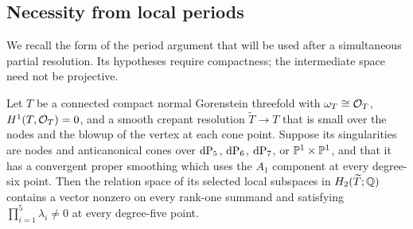 \subsection{Necessity from local periods}

We recall the form of the period argument that will be used after a
simultaneous partial resolution.  Its hypotheses require compactness;
the intermediate space need not be projective.

\begin{lemma}\label{lem04:periodnecessity}
Let $T$ be a connected compact normal Gorenstein threefold with
$\omega_T\cong\mathcal{O}_T$, $H^1(T,\mathcal{O}_T)=0$, and a smooth crepant
resolution $\widetilde T\to T$ that is small over the nodes and the blowup of
the vertex at each cone point.  Suppose its singularities are nodes
and anticanonical cones over $\mathrm{dP}_5$, $\mathrm{dP}_6$, $\mathrm{dP}_7$, or
$\mathbb{P}^1\times\mathbb{P}^1$, and that it has a
convergent proper smoothing which uses the $A_1$ component at every
degree-six point.  Then the relation space of its selected local
subspaces in $H_2(\widetilde T;\mathbb{Q})$ contains a vector nonzero
on every rank-one summand and satisfying
$\prod_{i=1}^5\lambda_i\ne0$ at every degree-five point.
\end{lemma}

